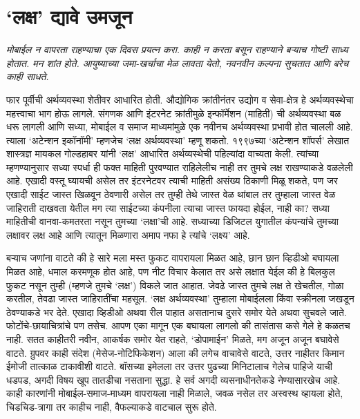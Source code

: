 \chapter{`लक्ष' द्यावे उमजून}

{\textit{मोबाईल न वापरता राहण्याचा एक दिवस प्रयत्न करा. काही न करता बसून राहण्याने बऱ्याच गोष्टी साध्य होतात. मन शांत होते. आयुष्याच्या जमा-खर्चाचा मेळ लावता येतो, नवनवीन कल्पना सुचतात आणि बरेच काही साधते.}}

\vspace{1.5em}

फार पूर्वीची अर्थव्यवस्था शेतीवर आधारित होती. औद्योगिक क्रांतीनंतर उद्योग व सेवा-क्षेत्र हे अर्थव्यवस्थेचा महत्त्वाचा  भाग होऊ लागले. संगणक आणि इंटरनेट क्रांतीमुळे इन्फॉर्मेशन (माहिती) ची अर्थव्यवस्था बळ धरू लागली आणि सध्या, मोबाईल व समाज माध्यमांमुळे एक नवीनच अर्थव्यवस्था प्रभावी होत चालली आहे. त्याला `अटेन्शन इकॉनॉमी' म्हणजेच `लक्ष अर्थव्यवस्था' म्हणू शकतो. १९९७च्या `अटेन्शन शॉपर्स' लेखात शास्त्रज्ञ मायकल गोल्डहाबर यांनी `लक्ष' आधारित अर्थव्यस्थेची पहिल्यांदा वाच्यता केली. त्यांच्या म्हणण्यानुसार सध्या स्पर्धा ही फक्त माहिती पुरवण्यात राहिलेलीच नाही तर तुमचे लक्ष राखण्याकडे वळलेली आहे. एखादी वस्तू घ्यायची असेल तर इंटरनेटवर त्याची माहिती असंख्य ठिकाणी मिळू शकते, पण जर एखादी साईट जास्त खिळवून ठेवणारी असेल तर तुम्ही तेथे जास्त वेळ थांबाल तर तुम्हाला जास्त वेळ जाहिराती दाखवता येतील मग त्या साईटच्या कंपनीला त्याचा जास्त फायदा होईल, नाही का? सध्या माहितीची वानवा-कमतरता नसून तुमच्या `लक्षा'ची आहे. सध्याच्या डिजिटल युगातील कंपन्यांचे तुमच्या लक्षावर लक्ष आहे आणि त्यातून मिळणारा अमाप नफा हे त्यांचे `लक्ष्य' आहे.

बऱ्याच जणांना वाटते की हे सारे मला मस्त फुकट वापरायला मिळत आहे, छान छान व्हिडीओ बघायला मिळत आहे, धमाल करमणूक होत आहे, पण नीट विचार केलात तर असे लक्षात येईल की हे बिलकुल फुकट नसून तुम्ही (म्हणजे तुमचे `लक्ष') विकले जात आहात. जेवढे जास्त तुमचे लक्ष ते खेचतील, गोळा करतील, तेवढा जास्त जाहिरातींचा महसूल. `लक्ष अर्थव्यवस्था' तुम्हाला मोबाईलला किंवा स्क्रीनला जखडून ठेवण्याकडे भर देते. एखादा व्हिडीओ अथवा रील पाहात असतानाच दुसरे समोर येते अथवा सुचवले जाते. फोटोंचे-छायाचित्रांचे पण तसेच. आपण एका मागून एक बघायला लागलो की तासंतास कसे गेले हे कळतच नाही. सतत काहीतरी नवीन, आकर्षक समोर येत राहते, `डोपामाईन' मिळते, मग अजून अजून बघावेसे वाटते. ग्रुपवर काही संदेश (मेसेज-नोटिफिकेशन) आला की लगेच वाचावेसे वाटते, उत्तर नाहीतर किमान ईमोजी तात्काळ टाकावीशी वाटते. बॉसच्या इमेलला तर उत्तर पुढच्या मिनिटालाच गेलेच पाहिजे याची धडपड, अगदी विषय खूप तातडीचा नसताना सुद्धा. हे सर्व अगदी व्यसनाधीनतेकडे नेण्यासारखेच आहे. काही कारणांनी मोबाईल-समाज-माध्यम वापरायला नाही मिळाले, जवळ नसेल तर अस्वस्थ व्हायला होते, चिडचिड-त्रागा तर काहीच नाही, वैफल्याकडे वाटचाल सुरू होते.

